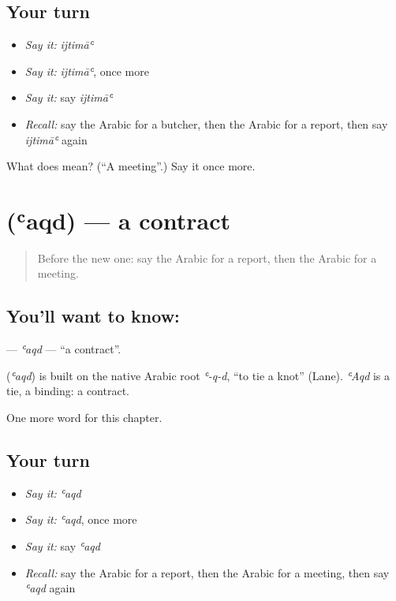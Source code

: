 \subsection*{Your turn}
\begin{itemize}
\raggedright
  \item \emph{Say it:} \emph{ijtimāʿ}
  \item \emph{Say it:} \emph{ijtimāʿ}, once more
  \item \emph{Say it:} say \emph{ijtimāʿ}
  \item \emph{Recall:} say the Arabic for a butcher, then the Arabic for a report, then say \emph{ijtimāʿ} again
\end{itemize}

\begin{tcolorbox}[breakable,colback=teal!4,colframe=teal!35!black,title={Before you move on}]
What does  mean? (\textquotedblleft{}A meeting\textquotedblright{}.) Say it once more.
\end{tcolorbox}
\section[\texorpdfstring{\ar{عقد} (ʿaqd)}{عقد (ʿaqd)}]{ (ʿaqd) — a contract}

\label{lesson:AR-C221-aqd}



\begin{quote}
Before the new one: say the Arabic for a report, then the Arabic for a meeting.
\end{quote}

\subsection*{You'll want to know: }
\textbf{} — \emph{ʿaqd} — \textquotedblleft{}a contract\textquotedblright{}.

\begin{cousinweb}
\textbf{} (\emph{ʿaqd}) is built on the native Arabic root \emph{ʿ-q-d}, \textquotedblleft{}to tie a knot\textquotedblright{} (Lane). \emph{ʿAqd} is a tie, a binding: a contract.
\end{cousinweb}

\begin{grammarlens}[title={What you've built}]
One more word for this chapter.
\end{grammarlens}

\subsection*{Your turn}
\begin{itemize}
\raggedright
  \item \emph{Say it:} \emph{ʿaqd}
  \item \emph{Say it:} \emph{ʿaqd}, once more
  \item \emph{Say it:} say \emph{ʿaqd}
  \item \emph{Recall:} say the Arabic for a report, then the Arabic for a meeting, then say \emph{ʿaqd} again
\end{itemize}


